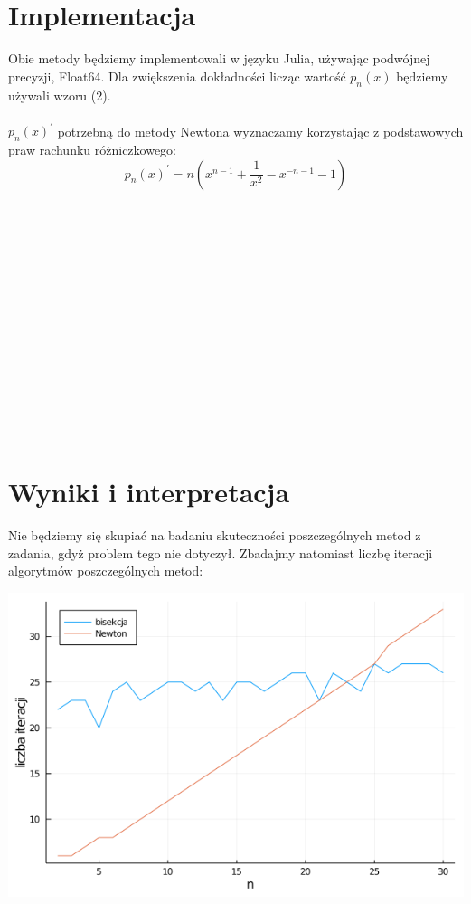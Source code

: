 \documentclass{article}
\begin{document}
\section{Implementacja}
Obie metody będziemy implementowali w języku Julia, używając podwójnej precyzji, Float64.
Dla zwiększenia dokładności licząc wartość $p_n(x)$ będziemy używali wzoru (2).\\\\
$p_n(x)^\prime$ potrzebną do metody Newtona wyznaczamy korzystając z podstawowych praw rachunku różniczkowego:
\begin{equation}
p_n(x)^\prime = n ( x^{n-1} + \frac{1}{x^2} - x^{-n - 1} -1)
\end{equation}
\\\\\\\\\\\\\\\\\\\\\\\\\\\\

\section{Wyniki i interpretacja}
Nie będziemy się skupiać na badaniu skuteczności poszczególnych metod z zadania, gdyż problem tego nie dotyczył. Zbadajmy natomiast liczbę iteracji algorytmów poszczególnych metod:

\includegraphics[scale=0.45]{wykres1}
\end{document}
